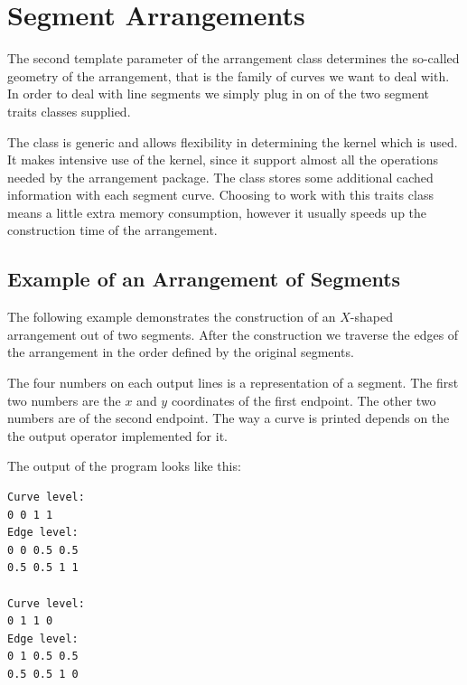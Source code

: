 
\section{Segment Arrangements}

The second template parameter of the arrangement class determines the
so-called geometry of the arrangement, that is the family of curves we
want to deal with. In order to deal with line segments we simply plug
in on of the two segment traits classes supplied.

The  class is generic and allows
flexibility in determining the kernel which is used. It makes intensive
use of the kernel, since it support almost all the operations needed by the
arrangement package. The  class
stores some additional cached information with each segment curve. Choosing
to work with this traits class means a little extra memory consumption, 
however it usually speeds up the construction time of the arrangement.

\subsection{Example of an Arrangement of Segments}
The following example demonstrates the construction of an $X$-shaped
arrangement out of two segments.  After the construction we traverse
the edges of the arrangement in the order defined by the original
segments.

The four numbers on each output lines is a representation of a segment.
The first two numbers are the $x$ and $y$ coordinates of the first endpoint.
The other two numbers are of the second endpoint. The way a curve is
printed depends on the the output operator implemented for it.


The output of the program looks like this:
\begin{verbatim}
Curve level:
0 0 1 1
Edge level:
0 0 0.5 0.5
0.5 0.5 1 1

Curve level:
0 1 1 0
Edge level:
0 1 0.5 0.5
0.5 0.5 1 0
\end{verbatim}


